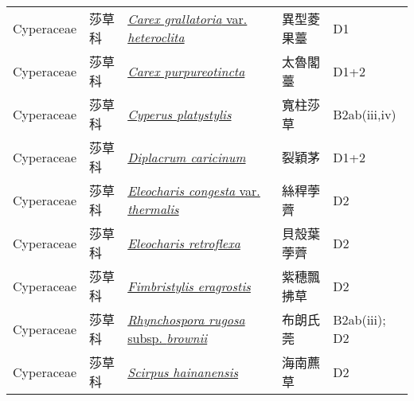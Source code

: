 {\begin{longtable}{p{2.5cm}p{2cm}p{5cm}p{2.5cm}p{3cm}}
    Cyperaceae & 莎草科 & \href{http://www.theplantlist.org/tpl1.1/search?q=Carex+grallatoria+var.+heteroclita}{\textit{Carex grallatoria} var. \textit{heteroclita} } & 異型菱果薹 & D1 \index{Carex@\textit{Carex}!grallatoria@\textit{grallatoria}!var. heteroclita@var. \textit{heteroclita}}  \index{異型菱果薹} \\
    Cyperaceae & 莎草科 & \href{http://www.theplantlist.org/tpl1.1/search?q=Carex+purpureotincta}{\textit{Carex purpureotincta} } & 太魯閣薹 & D1+2 \index{Carex@\textit{Carex}!purpureotincta@\textit{purpureotincta}}  \index{太魯閣薹} \\
    Cyperaceae & 莎草科 & \href{http://www.theplantlist.org/tpl1.1/search?q=Cyperus+platystylis}{\textit{Cyperus platystylis} } & 寬柱莎草 & B2ab(iii,iv) \index{Cyperus@\textit{Cyperus}!platystylis@\textit{platystylis}}  \index{寬柱莎草} \\
    Cyperaceae & 莎草科 & \href{http://www.theplantlist.org/tpl1.1/search?q=Diplacrum+caricinum}{\textit{Diplacrum caricinum} } & 裂穎茅 & D1+2 \index{Diplacrum@\textit{Diplacrum}!caricinum@\textit{caricinum}}  \index{裂穎茅} \\
    Cyperaceae & 莎草科 & \href{http://www.theplantlist.org/tpl1.1/search?q=Eleocharis+congesta+var.+thermalis}{\textit{Eleocharis congesta} var. \textit{thermalis} } & 絲稈荸薺 & D2 \index{Eleocharis@\textit{Eleocharis}!congesta@\textit{congesta}!var. thermalis@var. \textit{thermalis}}  \index{絲稈荸薺} \\
    Cyperaceae & 莎草科 & \href{http://www.theplantlist.org/tpl1.1/search?q=Eleocharis+retroflexa}{\textit{Eleocharis retroflexa} } & 貝殼葉荸薺 & D2 \index{Eleocharis@\textit{Eleocharis}!retroflexa@\textit{retroflexa}}  \index{貝殼葉荸薺} \\
    Cyperaceae & 莎草科 & \href{http://www.theplantlist.org/tpl1.1/search?q=Fimbristylis+eragrostis}{\textit{Fimbristylis eragrostis} } & 紫穗飄拂草 & D2 \index{Fimbristylis@\textit{Fimbristylis}!eragrostis@\textit{eragrostis}}  \index{紫穗飄拂草} \\
    Cyperaceae & 莎草科 & \href{http://www.theplantlist.org/tpl1.1/search?q=Rhynchospora+rugosa+subsp.+brownii}{\textit{Rhynchospora rugosa} subsp. \textit{brownii} } & 布朗氏莞 & B2ab(iii); D2 \index{Rhynchospora@\textit{Rhynchospora}!rugosa@\textit{rugosa}!subsp. brownii@subsp. \textit{brownii}}  \index{布朗氏莞} \\
    Cyperaceae & 莎草科 & \href{http://www.theplantlist.org/tpl1.1/search?q=Scirpus+hainanensis}{\textit{Scirpus hainanensis} } & 海南藨草 & D2 \index{Scirpus@\textit{Scirpus}!hainanensis@\textit{hainanensis}}  \index{海南藨草} \\

\end{longtable}}
